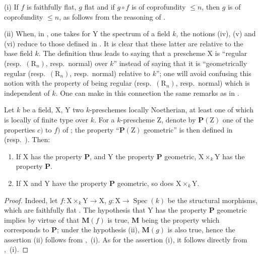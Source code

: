 \begin{remarks}[6.8.4]
\label{IV.6.8.4}
(i) If $f$ is faithfully flat, $g$ flat and if $g\circ f$ is of coprofundity $\leqslant n$, then $g$ is of coprofundity $\leqslant n$, as follows from the reasoning of .

(ii) When, in , one takes for $\mathrm{Y}$ the spectrum of a field $k$, the notions (iv), (v) and (vi) reduce to those defined in . It is clear that these latter are relative to the base field $k$. The definition  thus leads to saying that a prescheme $\mathrm{X}$ is ``regular (resp.\ $(\mathrm{R}_n)$, resp.\ normal) over $k$'' instead of saying that it is ``geometrically regular (resp.\ $(\mathrm{R}_n)$, resp.\ normal) relative to $k$''; one will avoid confusing this notion with the property of being regular (resp.\ $(\mathrm{R}_n)$, resp.\ normal) which is independent of $k$. One can make in this connection the same remarks as in .
\end{remarks}

\begin{proposition}[6.8.5]
\label{IV.6.8.5}
Let $k$ be a field, $\mathrm{X}$, $\mathrm{Y}$ two $k$-preschemes locally Noetherian, at least one of which is locally of finite type over $k$. For a $k$-prescheme $\mathrm{Z}$, denote by $\boldsymbol{P}(\mathrm{Z})$ one of the properties $c)$ to $f)$ of ; the property ``$\boldsymbol{P}(\mathrm{Z})$ geometric'' is then defined in  (resp.\ ). Then:
\begin{enumerate}[label=(\roman*)]
  \item If $\mathrm{X}$ has the property $\boldsymbol{P}$, and $\mathrm{Y}$ the property $\boldsymbol{P}$ geometric, $\mathrm{X}\times_k\mathrm{Y}$ has the property $\boldsymbol{P}$.
  \item If $\mathrm{X}$ and $\mathrm{Y}$ have the property $\boldsymbol{P}$ geometric, so does $\mathrm{X}\times_k\mathrm{Y}$.
\end{enumerate}
\end{proposition}

\begin{proof}
Indeed, let $f:\mathrm{X}\times_k\mathrm{Y}\to\mathrm{X}$, $g:\mathrm{X}\to\operatorname{Spec}(k)$ be the structural morphisms, which are faithfully flat . The hypothesis that $\mathrm{Y}$ has the property $\boldsymbol{P}$ geometric implies by virtue of  that $\boldsymbol{M}(f)$ is true, $\boldsymbol{M}$ being the property  which corresponds to $\boldsymbol{P}$; under the hypothesis (ii), $\boldsymbol{M}(g)$ is also true, hence the assertion (ii) follows from ,~(i). As for the assertion (i), it follows directly from ,~(i).
\end{proof}

